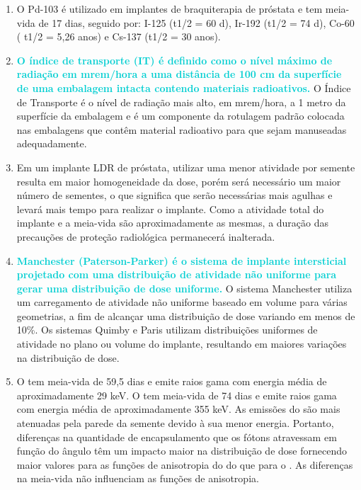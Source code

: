 \documentclass[11pt,a4paper]{article}
\begin{document}
\begin{enumerate}
        \item O Pd-103 é utilizado em implantes de braquiterapia de próstata e tem meia-vida de 17 dias, seguido por: I-125 (t1/2 = 60 d), Ir-192 (t1/2 = 74 d), Co-60 ( t1/2 = 5,26 anos) e Cs-137 (t1/2 = 30 anos).

        \item \textcolor{DarkTurquoise}{\textbf{O índice de transporte (IT) é definido como o nível máximo de radiação em mrem/hora a uma distância de 100 cm da superfície de uma embalagem intacta contendo materiais radioativos. }} O Índice de Transporte é o nível de radiação mais alto, em mrem/hora, a 1 metro da superfície da embalagem e é um componente da rotulagem padrão colocada nas embalagens que contêm material radioativo para que sejam manuseadas adequadamente.

        \item Em um implante LDR de próstata, utilizar uma menor atividade por semente resulta em maior homogeneidade da dose, porém será necessário um maior número de sementes, o que significa que serão necessárias mais agulhas e levará mais tempo para realizar o implante. Como a atividade total do implante e a meia-vida são aproximadamente as mesmas, a duração das precauções de proteção radiológica permanecerá inalterada.

        \item \textcolor{DarkTurquoise}{\textbf{Manchester (Paterson-Parker) é o sistema de implante intersticial projetado com uma distribuição de atividade não uniforme para gerar uma distribuição de dose uniforme.}} O sistema Manchester utiliza um carregamento de atividade não uniforme baseado em volume para várias geometrias, a fim de alcançar uma distribuição de dose variando em menos de 10\%. Os sistemas Quimby e Paris utilizam distribuições uniformes de atividade no plano ou volume do implante, resultando em maiores variações na distribuição de dose.

        \item O  tem meia-vida de 59,5 dias e emite raios gama com energia média de aproximadamente 29 keV. O  tem meia-vida de 74 dias e emite raios gama com energia média de aproximadamente 355 keV. As emissões do  são mais atenuadas pela parede da semente devido à sua menor energia. Portanto, diferenças na quantidade de encapsulamento que os fótons atravessam em função do ângulo têm um impacto maior na distribuição de dose fornecendo maior valores para as funções de anisotropia do  do que para o . As diferenças na meia-vida não influenciam as funções de anisotropia.
            

\end{enumerate}
\end{document}

